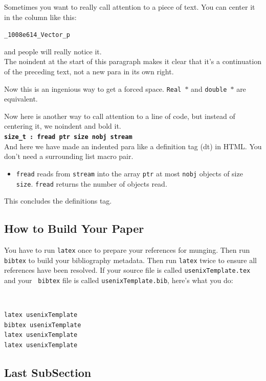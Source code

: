 \documentclass[letterpaper,twocolumn,10pt]{article}
\begin{document}
Sometimes you want to really call attention to a piece of text.  You
can center it in the column like this:
\begin{center}
{\tt \_1008e614\_Vector\_p}
\end{center}
and people will really notice it.\\

\noindent
The noindent at the start of this paragraph makes it clear that it's
a continuation of the preceding text, not a new para in its own right.


Now this is an ingenious way to get a forced space.
{\tt Real~$*$} and {\tt double~$*$} are equivalent. 

Now here is another way to call attention to a line of code, but instead
of centering it, we noindent and bold it.\\

\noindent
{\bf \tt size\_t : fread ptr size nobj stream } \\

And here we have made an indented para like a definition tag (dt)
in HTML.  You don't need a surrounding list macro pair.
\begin{itemize}
\item[]  {\tt fread} reads from {\tt stream} into the array {\tt ptr} at
most {\tt nobj} objects of size {\tt size}.   {\tt fread} returns
the number of objects read. 
\end{itemize}
This concludes the definitions tag.

\subsection{How to Build Your Paper}

You have to run {\tt latex} once to prepare your references for
munging.  Then run {\tt bibtex} to build your bibliography metadata.
Then run {\tt latex} twice to ensure all references have been resolved.
If your source file is called {\tt usenixTemplate.tex} and your {\tt
  bibtex} file is called {\tt usenixTemplate.bib}, here's what you do:
{\tt \small
\begin{verbatim}
latex usenixTemplate
bibtex usenixTemplate
latex usenixTemplate
latex usenixTemplate
\end{verbatim}
}


\subsection{Last SubSection}
\end{document}
